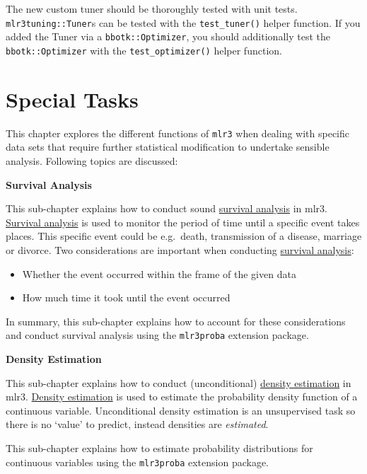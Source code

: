 \documentclass[
]{scrbook}
\providecommand{\tightlist}{%
  \setlength{\itemsep}{0pt}\setlength{\parskip}{0pt}}
\begin{document}
The new custom tuner should be thoroughly tested with unit tests.
\texttt{mlr3tuning::Tuner}s can be tested with the \texttt{test\_tuner()} helper function.
If you added the Tuner via a \texttt{bbotk::Optimizer}, you should additionally test the \texttt{bbotk::Optimizer} with the \texttt{test\_optimizer()} helper function.

\hypertarget{special-tasks}{%
\chapter{Special Tasks}\label{special-tasks}}

This chapter explores the different functions of \texttt{mlr3} when dealing with specific data sets that require further statistical modification to undertake sensible analysis.
Following topics are discussed:

\textbf{Survival Analysis}

This sub-chapter explains how to conduct sound \protect\hyperlink{survival}{survival analysis} in mlr3.
\protect\hyperlink{survival}{Survival analysis} is used to monitor the period of time until a specific event takes places.
This specific event could be e.g.~death, transmission of a disease, marriage or divorce.
Two considerations are important when conducting \protect\hyperlink{survival}{survival analysis}:

\begin{itemize}
\tightlist
\item
  Whether the event occurred within the frame of the given data
\item
  How much time it took until the event occurred
\end{itemize}

In summary, this sub-chapter explains how to account for these considerations and conduct survival analysis using the \texttt{mlr3proba} extension package.

\textbf{Density Estimation}

This sub-chapter explains how to conduct (unconditional) \protect\hyperlink{density}{density estimation} in mlr3.
\protect\hyperlink{density}{Density estimation} is used to estimate the probability density function of a continuous variable. Unconditional density estimation is an unsupervised task so there is no `value' to predict, instead densities are \emph{estimated}.

This sub-chapter explains how to estimate probability distributions for continuous variables using the \texttt{mlr3proba} extension package.
\end{document}
